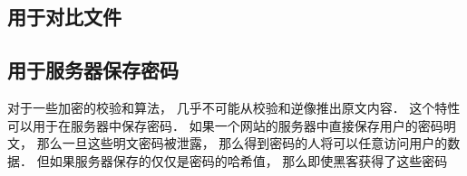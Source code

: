 
\subsection{用于对比文件}


\subsection{用于服务器保存密码}
对于一些加密的校验和算法， 几乎不可能从校验和逆像推出原文内容． 这个特性可以用于在服务器中保存密码． 如果一个网站的服务器中直接保存用户的密码明文， 那么一旦这些明文密码被泄露， 那么得到密码的人将可以任意访问用户的数据． 但如果服务器保存的仅仅是密码的哈希值， 那么即使黑客获得了这些密码

